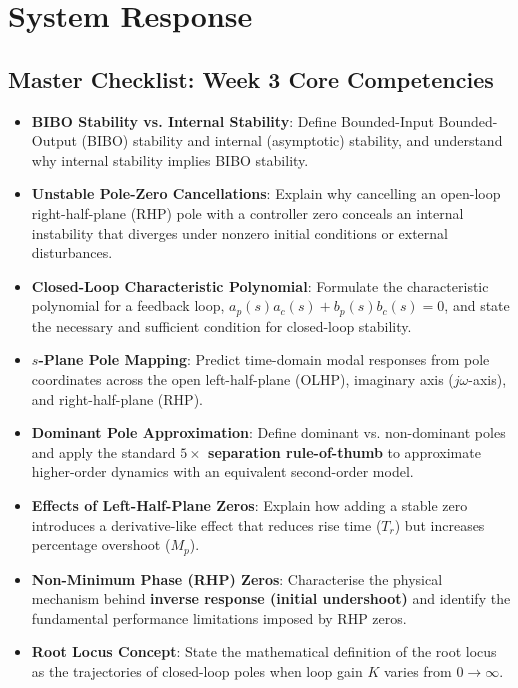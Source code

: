 \documentclass[12pt,onecolumn,twoside ]{article}
\begin{document}
	\newpage
	\section{System Response}

	\subsection{Master Checklist: Week 3 Core Competencies}
	\begin{itemize}
		\item[$\square$]
		\textbf{BIBO Stability vs. Internal Stability}: Define Bounded-Input Bounded-Output (BIBO) stability and internal (asymptotic) stability, and understand why internal stability implies BIBO stability.
		\item[$\square$]
		\textbf{Unstable Pole-Zero Cancellations}: Explain why cancelling an open-loop right-half-plane (RHP) pole with a controller zero conceals an internal instability that diverges under nonzero initial conditions or external disturbances.
		\item[$\square$]
		\textbf{Closed-Loop Characteristic Polynomial}: Formulate the characteristic polynomial for a feedback loop, $a_p(s)a_c(s) + b_p(s)b_c(s) = 0$, and state the necessary and sufficient condition for closed-loop stability.
		\item[$\square$]
		\textbf{$s$-Plane Pole Mapping}: Predict time-domain modal responses from pole coordinates across the open left-half-plane (OLHP), imaginary axis ($j\omega$-axis), and right-half-plane (RHP).
		\item[$\square$]
		\textbf{Dominant Pole Approximation}: Define dominant vs. non-dominant poles and apply the standard \textbf{$5\times$ separation rule-of-thumb} to approximate higher-order dynamics with an equivalent second-order model.
		\item[$\square$]
		\textbf{Effects of Left-Half-Plane Zeros}: Explain how adding a stable zero introduces a derivative-like effect that reduces rise time ($T_r$) but increases percentage overshoot ($M_p$).
		\item[$\square$]
		\textbf{Non-Minimum Phase (RHP) Zeros}: Characterise the physical mechanism behind \textbf{inverse response (initial undershoot)} and identify the fundamental performance limitations imposed by RHP zeros.
		\item[$\square$]
		\textbf{Root Locus Concept}: State the mathematical definition of the root locus as the trajectories of closed-loop poles when loop gain $K$ varies from $0 \to \infty$.

\end{itemize}
\end{document}
